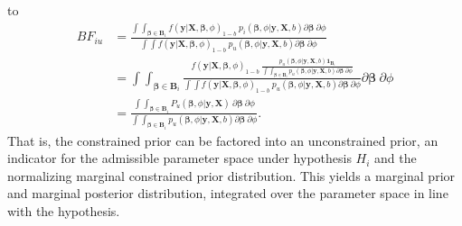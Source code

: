 \documentclass[
]{interact}
\begin{document}
to \[
\begin{aligned}
BF_{iu} &= 
\frac{
  \int \int_{\boldsymbol{\beta} \in \boldsymbol{B}_i} f (\boldsymbol{y} | \boldsymbol{X}, \boldsymbol{\beta}, \phi)_{1-b} ~ p_i(\boldsymbol{\beta}, \phi | \boldsymbol{y}, \boldsymbol{X}, b) \partial \boldsymbol{\beta} ~ \partial \phi
}{
  \int \int f(\boldsymbol{y} | \boldsymbol{X}, \boldsymbol{\beta}, \phi)_{1-b} ~ p_u(\boldsymbol{\beta}, \phi | \boldsymbol{y}, \boldsymbol{X}, b) \partial \boldsymbol{\beta} ~ \partial \phi
} \\
&= \int \int_{\boldsymbol{\beta} \in \boldsymbol{B}_i} 
\frac{
  f (\boldsymbol{y} | \boldsymbol{X}, \boldsymbol{\beta}, \phi)_{1-b} ~  
  \frac{
    p_u (\boldsymbol{\beta}, \phi | \boldsymbol{y}, \boldsymbol{X}, b) \boldsymbol{1}_{\boldsymbol{B}_i}
  }{
    \int \int_{\boldsymbol{\beta} \in \boldsymbol{B}_i} p_u (\boldsymbol{\beta}, \phi | \boldsymbol{y}, \boldsymbol{X}, b) \partial \boldsymbol{\beta} ~ \partial \phi
  }
}{
  \int \int f(\boldsymbol{y} | \boldsymbol{X}, \boldsymbol{\beta}, \phi)_{1-b} ~ p_u(\boldsymbol{\beta}, \phi | \boldsymbol{y}, \boldsymbol{X}, b) \partial \boldsymbol{\beta} ~ \partial \phi
} \partial \boldsymbol{\beta} ~ \partial \phi \\
&= \frac{
   \int \int_{\boldsymbol{\beta} \in \boldsymbol{B}_i} P_u(\boldsymbol{\beta}, \phi| \boldsymbol{y}, \boldsymbol{X}) ~ \partial \boldsymbol{\beta} ~ \partial \phi
}{
  \int\int_{\boldsymbol{\beta} \in \boldsymbol{B}_i} p_u(\boldsymbol{\beta}, \phi | \boldsymbol{y}, \boldsymbol{X}, b) \partial \boldsymbol{\beta} ~ \partial \phi
}.
\end{aligned}
\] That is, the constrained prior can be factored into an unconstrained
prior, an indicator for the admissible parameter space under hypothesis
\(H_i\) and the normalizing marginal constrained prior distribution.
This yields a marginal prior and marginal posterior distribution,
integrated over the parameter space in line with the hypothesis.
\end{document}
